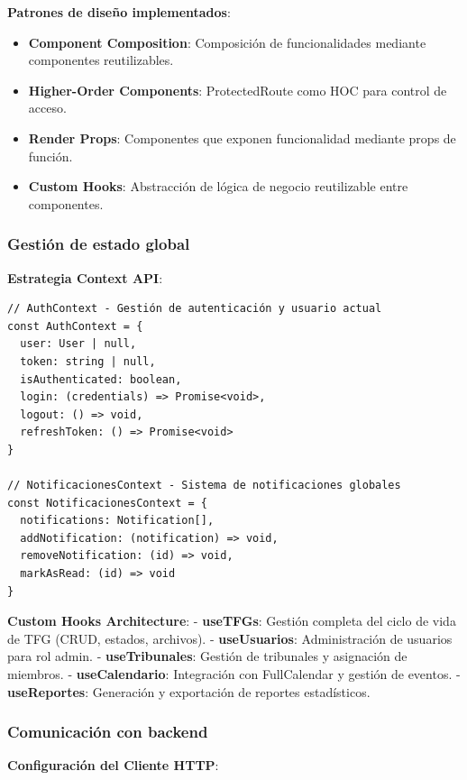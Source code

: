\documentclass[12pt,a4paper,oneside]{report}
\providecommand{\tightlist}{%
  \setlength{\itemsep}{0pt}\setlength{\parskip}{0pt}}
\begin{document}
\textbf{Patrones de diseño implementados}:

\begin{itemize}
\tightlist
\item
  \textbf{Component Composition}: Composición de funcionalidades
  mediante componentes reutilizables.
\item
  \textbf{Higher-Order Components}: ProtectedRoute como HOC para control
  de acceso.
\item
  \textbf{Render Props}: Componentes que exponen funcionalidad mediante
  props de función.
\item
  \textbf{Custom Hooks}: Abstracción de lógica de negocio reutilizable
  entre componentes.
\end{itemize}

\subsubsection{Gestión de estado
global}\label{gestiuxf3n-de-estado-global}

\textbf{Estrategia Context API}:

\begin{lstlisting}
// AuthContext - Gestión de autenticación y usuario actual
const AuthContext = {
  user: User | null,
  token: string | null,
  isAuthenticated: boolean,
  login: (credentials) => Promise<void>,
  logout: () => void,
  refreshToken: () => Promise<void>
}

// NotificacionesContext - Sistema de notificaciones globales
const NotificacionesContext = {
  notifications: Notification[],
  addNotification: (notification) => void,
  removeNotification: (id) => void,
  markAsRead: (id) => void
}
\end{lstlisting}

\textbf{Custom Hooks Architecture}: - \textbf{useTFGs}: Gestión completa
del ciclo de vida de TFG (CRUD, estados, archivos). -
\textbf{useUsuarios}: Administración de usuarios para rol admin. -
\textbf{useTribunales}: Gestión de tribunales y asignación de miembros.
- \textbf{useCalendario}: Integración con FullCalendar y gestión de
eventos. - \textbf{useReportes}: Generación y exportación de reportes
estadísticos.

\subsubsection{Comunicación con
backend}\label{comunicaciuxf3n-con-backend}

\textbf{Configuración del Cliente HTTP}:
\end{document}
